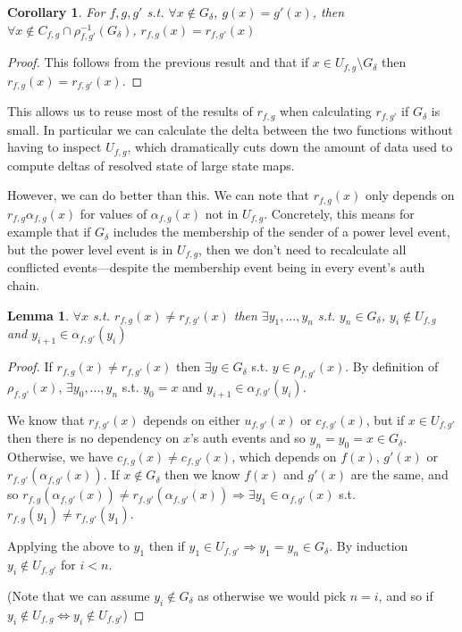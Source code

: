 \documentclass{article}
\newtheorem{lemma}[theorem]{Lemma}
\newtheorem{corollary}[theorem]{Corollary}
\begin{document}
\begin{corollary}
	For $f, g, g'$ s.t. $\forall x \notin G_\delta$, $g(x) = g'(x)$, then $\forall x \notin C_{f,g} \cap \rho_{f,g'}^{-1}(G_\delta)$, $r_{f,g}(x) = r_{f,g'}(x)$
\end{corollary}

\begin{proof}
	This follows from the previous result and that if $x \in U_{f,g} \setminus G_\delta$ then $r_{f,g}(x) = r_{f,g'}(x)$.
\end{proof}

This allows us to reuse most of the results of $r_{f,g}$ when calculating $r_{f,g'}$ if $G_\delta$ is small. In particular we can calculate the delta between the two functions without having to inspect $U_{f,g}$, which dramatically cuts down the amount of data used to compute deltas of resolved state of large state maps.

However, we can do better than this. We can note that $r_{f,g}(x)$ only depends on $r_{f,g}\alpha_{f,g}(x)$ for values of $\alpha_{f,g}(x)$ not in $U_{f,g}$. Concretely, this means for example that if $G_\delta$ includes the membership of the sender of a power level event, but the power level event is in $U_{f,g}$, then we don't need to recalculate all conflicted events---despite the membership event being in every event's auth chain.

\begin{lemma}
	$\forall x$ s.t. $r_{f,g}(x) \neq r_{f,g'}(x)$ then $\exists y_1, ..., y_n$ s.t. $y_n \in G_\delta$, $y_i \notin U_{f,g}$ and $y_{i+1} \in \alpha_{f,g'}(y_i)$
\end{lemma}

\begin{proof}
	If $r_{f,g}(x) \neq r_{f,g'}(x)$ then $\exists y \in G_\delta$ s.t. $y \in \rho_{f,g'}(x)$. By definition of $\rho_{f,g'}(x)$, $\exists y_0, ..., y_n$ s.t. $y_0 = x$ and $y_{i+1} \in \alpha_{f,g'}(y_i)$. 
	
	We know that $r_{f,g'}(x)$ depends on either $u_{f,g'}(x)$ or $c_{f,g'}(x)$, but if $x \in U_{f,g'}$ then there is no dependency on $x$'s auth events and so $y_n = y_0 = x \in G_\delta$. Otherwise, we have $c_{f,g}(x) \neq c_{f,g'}(x)$, which depends on $f(x)$, $g'(x)$ or $r_{f,g'}(\alpha_{f,g'}(x))$. If $x \notin G_\delta$ then we know $f(x)$ and $g'(x)$ are the same, and so $r_{f,g}(\alpha_{f,g'}(x)) \neq r_{f,g'}(\alpha_{f,g'}(x)) \Rightarrow \exists y_1 \in \alpha_{f,g'}(x)$ s.t. $r_{f,g}(y_1) \neq r_{f,g'}(y_1)$.
	
	 Applying the above to $y_1$ then if $y_1 \in U_{f,g'} \Rightarrow y_1 = y_n \in G_\delta$. By induction $y_i \notin U_{f,g'}$ for $i < n$.
	 
	 (Note that we can assume $y_i \notin G_\delta$ as otherwise we would pick $n = i$,  and so if $y_i \notin U_{f,g} \Leftrightarrow y_i \notin U_{f,g'}$)
\end{proof}
\end{document}

